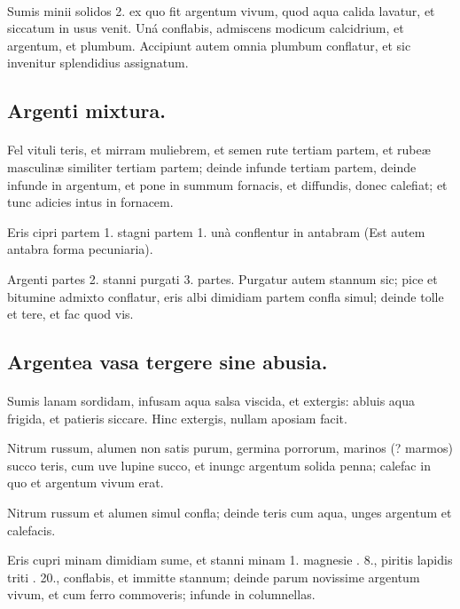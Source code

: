 \documentclass[a4paper, 11pt, oneside, polutonikogreek, italian]{article}
\begin{document}
\paragraph{}
Sumis minii solidos 2. ex quo fit argentum vivum, quod aqua calida lavatur, et siccatum in usus venit. Uná conflabis, admiscens modicum calcidrium, et argentum, et plumbum. Accipiunt autem omnia plumbum conflatur, et sic invenitur splendidius assignatum.

\subsection{Argenti mixtura.}
\paragraph{}
Fel vituli teris, et mirram muliebrem, et semen rute tertiam partem, et rubeæ masculinæ similiter tertiam partem; deinde infunde tertiam partem, deinde infunde in argentum, et pone in summum fornacis, et diffundis, donec calefiat; et tunc adicies intus in fornacem.

Eris cipri partem 1. stagni partem 1. unà conflentur in antabram (Est autem antabra forma pecuniaria).

Argenti partes 2. stanni purgati 3. partes. Purgatur autem stannum sic; pice et bitumine admixto conflatur, eris albi dimidiam partem confla simul; deinde tolle et tere, et fac quod vis.

\subsection{Argentea vasa tergere sine abusia.}
\paragraph{}
Sumis lanam sordidam, infusam aqua salsa viscida, et extergis: abluis aqua frigida, et patieris siccare. Hinc extergis, nullam aposiam facit.

Nitrum russum, alumen non satis purum, germina porrorum, marinos (? marmos) succo teris, cum uve lupine succo, et inungc argentum solida penna; calefac in quo et argentum vivum erat.

Nitrum russum et alumen simul confla; deinde teris cum aqua, unges argentum et calefacis.

Eris cupri minam dimidiam sume, et stanni minam 1. magnesie \roundz. 8., piritis lapidis triti \roundz. 20., conflabis, et immitte stannum; deinde parum novissime argentum vivum, et cum ferro commoveris; infunde in columnellas.
\end{document}
